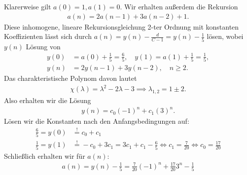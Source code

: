 \begin{solution}
Klarerweise gilt $a(0) = 1, a(1) = 0$. Wir erhalten außerdem die Rekursion
\begin{align*}
  a(n) = 2a(n-1) + 3a(n-2) + 1.
\end{align*}
Diese inhomogene, lineare Rekursionsgleichung 2-ter Ordnung mit konstanten
Koeffizienten lässt sich durch $a(n) = y(n) - \frac{d}{C-1} = y(n) - \frac{1}{5}$ lösen, wobei $y(n)$
Lösung von
\begin{align*}
  y(0) &= a(0) + \frac{1}{5} = \frac{6}{5}, \quad y(1) = a(1) + \frac{1}{5} = \frac{1}{5}, \\
  y(n) &= 2y(n-1) + 3y(n-2), \quad n \geq 2.
\end{align*}
Das charakteristische Polynom davon lautet
\begin{align*}
  \chi(\lambda) = \lambda^2 - 2\lambda - 3 \implies \lambda_{1,2} = 1 \pm 2.
\end{align*}
Also erhalten wir die Lösung
\begin{align*}
  y(n) = c_0(-1)^n + c_1(3)^n.
\end{align*}
Lösen wir die Konstanten nach den Anfangsbedingungen auf:
\begin{align*}
  \frac{6}{5} = y(0) &\stackrel{!}{=} c_0 + c_1 \\
  \frac{1}{5} = y(1) &\stackrel{!}{=} -c_0  + 3c_1 = 3c_1 + c_1 - \frac{6}{5}
  \iff c_1 = \frac{7}{20} \iff c_0 =  \frac{17}{20}
\end{align*}
Schließlich erhalten wir für $a(n)$:
\begin{align*}
  a(n) = y(n) - \frac{1}{5} = \frac{7}{20}(-1)^n + \frac{17}{20}3^n - \frac{1}{5}
\end{align*}
\end{solution}

